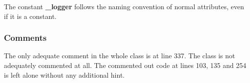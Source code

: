 \begin{itemize}
		The constant \textbf{\_logger} follows the naming convention of normal attributes, even if it is a constant.
\end{itemize}
%
\subsubsection{Comments}
\begin{itemize}
		The only adequate comment in the whole class is at line 337.
		The class is not adequately commented at all.
		The commented out code at lines 103, 135 and 254 is left alone without any additional hint.
\end{itemize}
%
